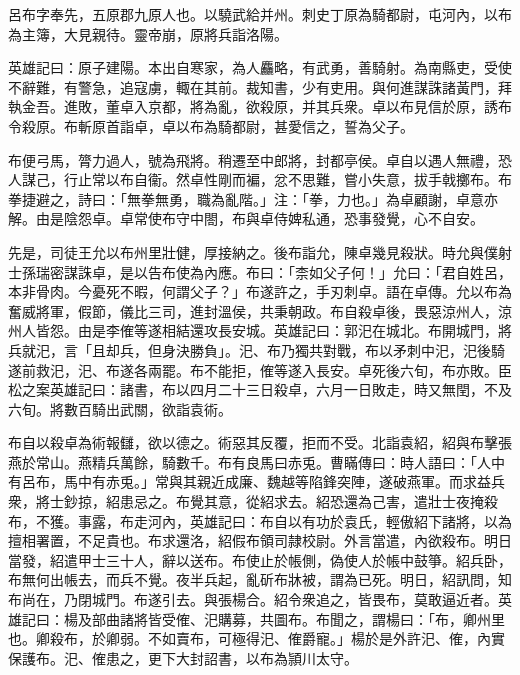 
\begin{pinyinscope}
呂布字奉先，五原郡九原人也。以驍武給并州。刺史丁原為騎都尉，屯河內，以布為主簿，大見親待。靈帝崩，原將兵詣洛陽。

英雄記曰：原子建陽。本出自寒家，為人麤略，有武勇，善騎射。為南縣吏，受使不辭難，有警急，追寇虜，輙在其前。裁知書，少有吏用。與何進謀誅諸黃門，拜執金吾。進敗，董卓入京都，將為亂，欲殺原，并其兵衆。卓以布見信於原，誘布令殺原。布斬原首詣卓，卓以布為騎都尉，甚愛信之，誓為父子。

布便弓馬，膂力過人，號為飛將。稍遷至中郎將，封都亭侯。卓自以遇人無禮，恐人謀己，行止常以布自衞。然卓性剛而褊，忿不思難，嘗小失意，拔手戟擲布。布拳捷避之，詩曰：「無拳無勇，職為亂階。」注：「拳，力也。」為卓顧謝，卓意亦解。由是陰怨卓。卓常使布守中閤，布與卓侍婢私通，恐事發覺，心不自安。

先是，司徒王允以布州里壯健，厚接納之。後布詣允，陳卓幾見殺狀。時允與僕射士孫瑞密謀誅卓，是以告布使為內應。布曰：「柰如父子何！」允曰：「君自姓呂，本非骨肉。今憂死不暇，何謂父子？」布遂許之，手刃刺卓。語在卓傳。允以布為奮威將軍，假節，儀比三司，進封溫侯，共秉朝政。布自殺卓後，畏惡涼州人，涼州人皆怨。由是李傕等遂相結還攻長安城。英雄記曰：郭汜在城北。布開城門，將兵就汜，言「且却兵，但身決勝負」。汜、布乃獨共對戰，布以矛刺中汜，汜後騎遂前救汜，汜、布遂各兩罷。布不能拒，傕等遂入長安。卓死後六旬，布亦敗。臣松之案英雄記曰：諸書，布以四月二十三日殺卓，六月一日敗走，時又無閏，不及六旬。將數百騎出武關，欲詣袁術。

布自以殺卓為術報讎，欲以德之。術惡其反覆，拒而不受。北詣袁紹，紹與布擊張燕於常山。燕精兵萬餘，騎數千。布有良馬曰赤兎。曹瞞傳曰：時人語曰：「人中有呂布，馬中有赤兎。」常與其親近成廉、魏越等陷鋒突陣，遂破燕軍。而求益兵衆，將士鈔掠，紹患忌之。布覺其意，從紹求去。紹恐還為己害，遣壯士夜掩殺布，不獲。事露，布走河內，英雄記曰：布自以有功於袁氏，輕傲紹下諸將，以為擅相署置，不足貴也。布求還洛，紹假布領司隷校尉。外言當遣，內欲殺布。明日當發，紹遣甲士三十人，辭以送布。布使止於帳側，偽使人於帳中鼓箏。紹兵卧，布無何出帳去，而兵不覺。夜半兵起，亂斫布牀被，謂為已死。明日，紹訊問，知布尚在，乃閉城門。布遂引去。與張楊合。紹令衆追之，皆畏布，莫敢逼近者。英雄記曰：楊及部曲諸將皆受傕、汜購募，共圖布。布聞之，謂楊曰：「布，卿州里也。卿殺布，於卿弱。不如賣布，可極得汜、傕爵寵。」楊於是外許汜、傕，內實保護布。汜、傕患之，更下大封詔書，以布為頴川太守。


\end{pinyinscope}